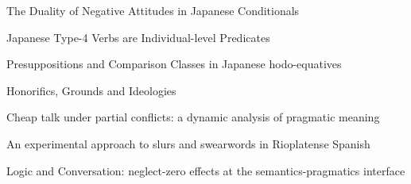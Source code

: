 \documentclass[12pt]{jarticle}
\begin{document}
  
      {The Duality of Negative Attitudes in Japanese Conditionals}
      {}
  
      {Japanese Type-4 Verbs are Individual-level Predicates}
      {}
  
      {Presuppositions and Comparison Classes in Japanese hodo-equatives}
      {}




  
      {Honorifics, Grounds and Ideologies}
      {}
  
      {Cheap talk under partial conflicts: a dynamic analysis of pragmatic meaning}
      {}
  
      {An experimental approach to slurs and swearwords in Rioplatense Spanish}
      {}




  
      {Logic and Conversation: neglect-zero effects at the semantics-pragmatics interface}
      {}







  
\end{document}
